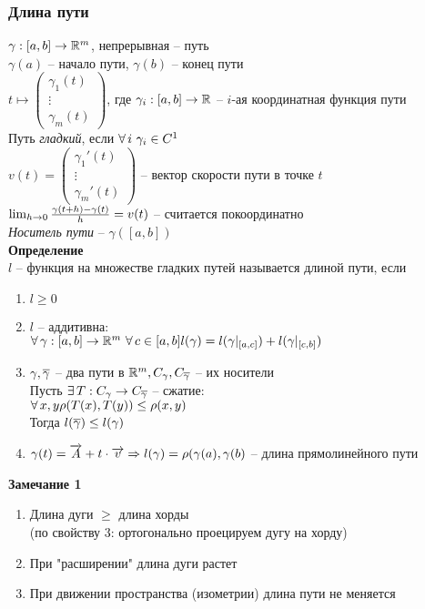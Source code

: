 \documentclass[12pt]{article}
\begin{document}
\subsubsection{Длина пути}
$\gamma: [a,b] \rightarrow \mathbb{R}^m$, непрерывная -- путь\\
$\gamma(a)$ -- начало пути, $\gamma(b)$ -- конец пути\\
$t \mapsto \begin{pmatrix}
\gamma_1(t)\\
\vdots\\
\gamma_m(t)
\end{pmatrix}$, где $\gamma_i: [a,b] \rightarrow \mathbb{R}$ -- $i$-ая координатная функция пути\\
Путь \textit{гладкий}, если $\forall\, i\ \gamma_i \in C^1$\\
$v(t) = \begin{pmatrix}
    \gamma_1'(t)\\
    \vdots\\
    \gamma_m'(t)
\end{pmatrix}$ -- вектор скорости пути в точке $t$\\
$\lim_{h\rightarrow 0}\frac{\gamma(t+h)-\gamma(t)}{h} = v(t)$ -- считается покоординатно\\
\textit{Носитель пути} -- $\gamma([a,b])$\\
\textbf{Определение}\\
$l$ -- функция на множестве гладких путей называется длиной пути, если
\begin{enumerate}
    \item $l \geq 0$
    \item $l$ -- аддитивна:\\
    $\forall\, \gamma: [a,b] \rightarrow \mathbb{R}^m\ \forall\, c \in [a,b] l(\gamma) = l(\gamma|_{[a,c]})+l(\gamma|_{[c,b]})$
    \item $\gamma, \overline\gamma$ -- два пути в $\mathbb{R}^m, C_\gamma, C_{\overline\gamma}$ -- их носители\\
    Пусть $\exists\, T: C_\gamma \rightarrow C_{\overline \gamma}$ -- сжатие:\\
    $\forall\, x,y \rho(T(x), T(y)) \leq \rho(x,y)$\\
    Тогда $l(\overline \gamma) \leq l(\gamma)$
    \item $\gamma(t) = \overrightarrow A+t\cdot\overrightarrow v \Rightarrow l(\gamma) = \rho(\gamma(a), \gamma(b)$ -- длина прямолинейного пути
\end{enumerate}
\textbf{Замечание 1}
\begin{enumerate}
    \item Длина дуги $\geq$ длина хорды\\
    (по свойству 3: ортогонально проецируем дугу на хорду)
    \item При "расширении" длина дуги растет
    \item При движении пространства (изометрии) длина пути не меняется
\end{enumerate}
\end{document}
